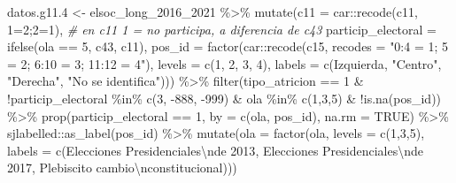 \documentclass[
  12pt,
]{book}
\newenvironment{Shaded}{\begin{snugshade}}{\end{snugshade}}
\newcommand{\AttributeTok}[1]{\textcolor[rgb]{0.77,0.63,0.00}{#1}}
\newcommand{\CommentTok}[1]{\textcolor[rgb]{0.56,0.35,0.01}{\textit{#1}}}
\newcommand{\ConstantTok}[1]{\textcolor[rgb]{0.00,0.00,0.00}{#1}}
\newcommand{\DecValTok}[1]{\textcolor[rgb]{0.00,0.00,0.81}{#1}}
\newcommand{\FloatTok}[1]{\textcolor[rgb]{0.00,0.00,0.81}{#1}}
\newcommand{\FunctionTok}[1]{\textcolor[rgb]{0.00,0.00,0.00}{#1}}
\newcommand{\NormalTok}[1]{#1}
\newcommand{\OtherTok}[1]{\textcolor[rgb]{0.56,0.35,0.01}{#1}}
\newcommand{\SpecialCharTok}[1]{\textcolor[rgb]{0.00,0.00,0.00}{#1}}
\newcommand{\StringTok}[1]{\textcolor[rgb]{0.31,0.60,0.02}{#1}}
\begin{document}
\begin{Shaded}
\begin{Highlighting}[]
\NormalTok{datos.g11}\FloatTok{.4} \OtherTok{\textless{}{-}}\NormalTok{ elsoc\_long\_2016\_2021 }\SpecialCharTok{\%\textgreater{}\%} 
  \FunctionTok{mutate}\NormalTok{(}\AttributeTok{c11 =}\NormalTok{ car}\SpecialCharTok{::}\FunctionTok{recode}\NormalTok{(c11, }\StringTok{\textquotesingle{}1=2;2=1\textquotesingle{}}\NormalTok{), }\CommentTok{\# en c11 1 = no participa, a diferencia de c43}
         \AttributeTok{particip\_electoral =} \FunctionTok{ifelse}\NormalTok{(ola }\SpecialCharTok{==} \DecValTok{5}\NormalTok{, c43, c11),}
         \AttributeTok{pos\_id =} \FunctionTok{factor}\NormalTok{(car}\SpecialCharTok{::}\FunctionTok{recode}\NormalTok{(c15, }\AttributeTok{recodes =} \StringTok{"0:4 = 1; 5 = 2; 6:10 = 3; 11:12 = 4"}\NormalTok{),}
                         \AttributeTok{levels =} \FunctionTok{c}\NormalTok{(}\DecValTok{1}\NormalTok{, }\DecValTok{2}\NormalTok{, }\DecValTok{3}\NormalTok{, }\DecValTok{4}\NormalTok{),}
                         \AttributeTok{labels =} \FunctionTok{c}\NormalTok{(}\StringTok{\textquotesingle{}Izquierda\textquotesingle{}}\NormalTok{, }\StringTok{"Centro"}\NormalTok{, }\StringTok{"Derecha"}\NormalTok{, }\StringTok{"No se identifica"}\NormalTok{))) }\SpecialCharTok{\%\textgreater{}\%}
  \FunctionTok{filter}\NormalTok{(tipo\_atricion }\SpecialCharTok{==} \DecValTok{1} \SpecialCharTok{\&} \SpecialCharTok{!}\NormalTok{particip\_electoral }\SpecialCharTok{\%in\%} \FunctionTok{c}\NormalTok{(}\DecValTok{3}\NormalTok{, }\SpecialCharTok{{-}}\DecValTok{888}\NormalTok{, }\SpecialCharTok{{-}}\DecValTok{999}\NormalTok{) }\SpecialCharTok{\&} 
\NormalTok{           ola }\SpecialCharTok{\%in\%} \FunctionTok{c}\NormalTok{(}\DecValTok{1}\NormalTok{,}\DecValTok{3}\NormalTok{,}\DecValTok{5}\NormalTok{) }\SpecialCharTok{\&} \SpecialCharTok{!}\FunctionTok{is.na}\NormalTok{(pos\_id)) }\SpecialCharTok{\%\textgreater{}\%} 
  \FunctionTok{prop}\NormalTok{(particip\_electoral }\SpecialCharTok{==} \DecValTok{1}\NormalTok{, }\AttributeTok{by =} \FunctionTok{c}\NormalTok{(ola, pos\_id), }\AttributeTok{na.rm =} \ConstantTok{TRUE}\NormalTok{) }\SpecialCharTok{\%\textgreater{}\%}
\NormalTok{  sjlabelled}\SpecialCharTok{::}\FunctionTok{as\_label}\NormalTok{(pos\_id) }\SpecialCharTok{\%\textgreater{}\%} 
  \FunctionTok{mutate}\NormalTok{(}\AttributeTok{ola =} \FunctionTok{factor}\NormalTok{(ola, }\AttributeTok{levels =} \FunctionTok{c}\NormalTok{(}\DecValTok{1}\NormalTok{,}\DecValTok{3}\NormalTok{,}\DecValTok{5}\NormalTok{), }\AttributeTok{labels =} \FunctionTok{c}\NormalTok{(}\StringTok{\textquotesingle{}Elecciones Presidenciales}\SpecialCharTok{\textbackslash{}n}\StringTok{de 2013\textquotesingle{}}\NormalTok{, }\StringTok{\textquotesingle{}Elecciones Presidenciales}\SpecialCharTok{\textbackslash{}n}\StringTok{de 2017\textquotesingle{}}\NormalTok{, }\StringTok{\textquotesingle{}Plebiscito cambio}\SpecialCharTok{\textbackslash{}n}\StringTok{constitucional\textquotesingle{}}\NormalTok{)))}



\end{Highlighting}
\end{Shaded}
\end{document}
